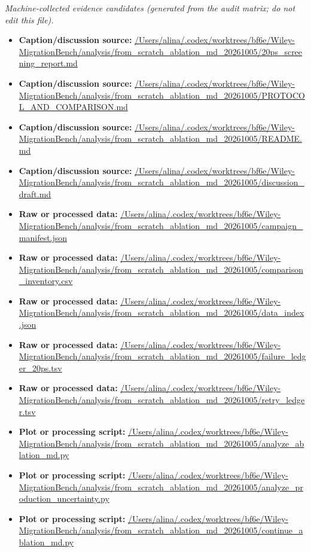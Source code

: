 \emph{Machine-collected evidence candidates (generated from the audit matrix; do not edit this file).}
\begin{itemize}[leftmargin=1.4em,noitemsep]
\item \textbf{Caption/discussion source:} \url{/Users/alina/.codex/worktrees/bf6e/Wiley-MigrationBench/analysis/from_scratch_ablation_md_20261005/20ps_screening_report.md}
\item \textbf{Caption/discussion source:} \url{/Users/alina/.codex/worktrees/bf6e/Wiley-MigrationBench/analysis/from_scratch_ablation_md_20261005/PROTOCOL_AND_COMPARISON.md}
\item \textbf{Caption/discussion source:} \url{/Users/alina/.codex/worktrees/bf6e/Wiley-MigrationBench/analysis/from_scratch_ablation_md_20261005/README.md}
\item \textbf{Caption/discussion source:} \url{/Users/alina/.codex/worktrees/bf6e/Wiley-MigrationBench/analysis/from_scratch_ablation_md_20261005/discussion_draft.md}
\item \textbf{Raw or processed data:} \url{/Users/alina/.codex/worktrees/bf6e/Wiley-MigrationBench/analysis/from_scratch_ablation_md_20261005/campaign_manifest.json}
\item \textbf{Raw or processed data:} \url{/Users/alina/.codex/worktrees/bf6e/Wiley-MigrationBench/analysis/from_scratch_ablation_md_20261005/comparison_inventory.csv}
\item \textbf{Raw or processed data:} \url{/Users/alina/.codex/worktrees/bf6e/Wiley-MigrationBench/analysis/from_scratch_ablation_md_20261005/data_index.json}
\item \textbf{Raw or processed data:} \url{/Users/alina/.codex/worktrees/bf6e/Wiley-MigrationBench/analysis/from_scratch_ablation_md_20261005/failure_ledger_20ps.tsv}
\item \textbf{Raw or processed data:} \url{/Users/alina/.codex/worktrees/bf6e/Wiley-MigrationBench/analysis/from_scratch_ablation_md_20261005/retry_ledger.tsv}
\item \textbf{Plot or processing script:} \url{/Users/alina/.codex/worktrees/bf6e/Wiley-MigrationBench/analysis/from_scratch_ablation_md_20261005/analyze_ablation_md.py}
\item \textbf{Plot or processing script:} \url{/Users/alina/.codex/worktrees/bf6e/Wiley-MigrationBench/analysis/from_scratch_ablation_md_20261005/analyze_production_uncertainty.py}
\item \textbf{Plot or processing script:} \url{/Users/alina/.codex/worktrees/bf6e/Wiley-MigrationBench/analysis/from_scratch_ablation_md_20261005/continue_ablation_md.py}

\end{itemize}
